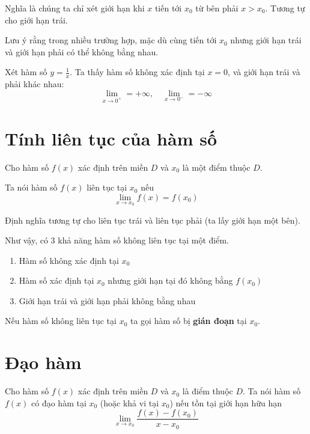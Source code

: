 Nghĩa là chúng ta chỉ xét giới hạn khi $x$ tiến tới $x_0$ từ bên phải $x > x_0$.
Tương tự cho giới hạn trái.

Lưu ý rằng trong nhiều trường hợp, mặc dù cùng tiến tới $x_0$ nhưng
giới hạn trái và giới hạn phải có thể không bằng nhau.

\begin{example}
    Xét hàm số $y = \frac{1}{x}$. Ta thấy hàm số không xác định
    tại $x = 0$, và giới hạn trái và phải khác nhau:
    \[\lim_{x \to 0^+} = +\infty, \quad \lim_{x \to 0^-} = -\infty\]
\end{example}

\section{Tính liên tục của hàm số}

Cho hàm số $f(x)$ xác định trên miền $D$ và $x_0$ là một điểm thuộc $D$.

\begin{definition}
    Ta nói hàm số $f(x)$ liên tục tại $x_0$ nếu
    \[\lim_{x \to x_0} f(x) = f(x_0)\]
\end{definition}

Định nghĩa tương tự cho liên tục trái và liên tục phải (ta lấy giới hạn một bên).

Như vậy, có 3 khả năng hàm số không liên tục tại một điểm.

\begin{enumerate}[noitemsep]
    \item Hàm số không xác định tại $x_0$
    \item Hàm số xác định tại $x_0$ nhưng giới hạn tại đó không bằng $f(x_0)$
    \item Giới hạn trái và giới hạn phải không bằng nhau
\end{enumerate}

Nếu hàm số không liên tục tại $x_0$ ta gọi hàm số bị \textbf{gián đoạn} tại $x_0$.

\section{Đạo hàm}

\begin{definition}
    Cho hàm số $f(x)$ xác định trên miền $D$ và $x_0$ là điểm thuộc $D$.
    Ta nói hàm số $f(x)$ có đạo hàm tại $x_0$ (hoặc khả vi tại $x_0$) nếu
    tồn tại giới hạn hữu hạn
    \[\lim_{x \to x_0}\frac{f(x) - f(x_0)}{x - x_0}\]
\end{definition}

